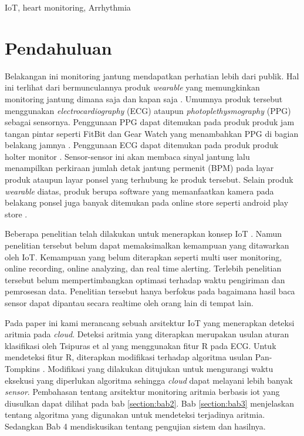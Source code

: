 \documentclass[]{indojc}
\begin{document}
\begin{keywords}
IoT, heart monitoring, Arrhythmia
\end{keywords}

\section{Pendahuluan}
Belakangan ini monitoring jantung mendapatkan perhatian lebih dari publik. Hal ini terlihat dari bermunculannya produk \textit{wearable} yang memungkinkan monitoring jantung dimana saja dan kapan saja \cite{online:fitbit, online:samsung_gear, online:endo_holter}. Umumnya produk tersebut menggunakan \textit{electrocardiography} (ECG) ataupun \textit{photoplethysmography} (PPG) sebagai sensornya. Penggunaan PPG dapat ditemukan pada produk produk jam tangan pintar seperti FitBit dan Gear Watch yang menambahkan PPG di bagian belakang jamnya \cite{online:fitbit, online:samsung_gear}. Penggunaan ECG dapat ditemukan pada produk produk holter monitor \cite{online:endo_holter}. Sensor-sensor ini akan membaca sinyal jantung lalu menampilkan perkiraan jumlah detak jantung permenit (BPM) pada layar produk ataupun layar ponsel yang terhubung ke produk tersebut. Selain produk \textit{wearable} diatas, produk berupa software yang memanfaatkan kamera pada belakang ponsel juga banyak ditemukan pada online store seperti android play store \cite{playstore_heart}.

Beberapa penelitian telah dilakukan untuk menerapkan konsep IoT \cite{daniel_barataa, paola_pierleoni, vasu_jindal, mamidi}. Namun penelitian tersebut belum dapat memaksimalkan kemampuan yang ditawarkan oleh IoT. Kemampuan yang belum diterapkan seperti multi user monitoring, online recording, online analyzing, dan real time alerting. Terlebih penelitian tersebut belum mempertimbangkan optimasi terhadap waktu pengiriman dan pemrosesan data. Penelitian tersebut hanya berfokus pada bagaimana hasil baca sensor dapat dipantau secara realtime oleh orang lain di tempat lain.

Pada paper ini kami merancang sebuah arsitektur IoT yang menerapkan deteksi aritmia pada \textit{cloud}. Deteksi aritmia yang diterapkan merupakan usulan aturan klasifikasi oleh Tsipuras et al \cite{tsipouras} yang menggunakan fitur R pada ECG. Untuk mendeteksi fitur R, diterapkan modifikasi terhadap algoritma usulan Pan-Tompkins \cite{pantom}. Modifikasi yang dilakukan ditujukan untuk mengurangi waktu eksekusi yang diperlukan algoritma sehingga \textit{cloud} dapat melayani lebih banyak \textit{sensor}. Pembahasan tentang arsitektur monitoring aritmia berbasis iot yang diusulkan dapat dilihat pada bab \ref{section:bab2}. Bab \ref{section:bab3} menjelaskan tentang algoritma yang digunakan untuk mendeteksi terjadinya aritmia. Sedangkan Bab 4 mendiskusikan tentang pengujian sistem dan hasilnya.
\end{document}
